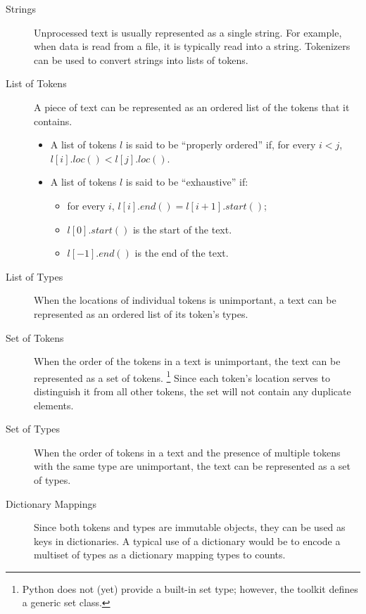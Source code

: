 \documentclass[11pt]{article}
\begin{document}
  \begin{description}

    \item[Strings] Unprocessed text is usually represented as a single
    string.  For example, when data is read from a file, it is
    typically read into a string.  Tokenizers can be used to convert
    strings into lists of tokens.

    \item[List of Tokens] A piece of text can be represented as an
    ordered list of the tokens that it contains.

    \begin{itemize}

        \item A list of tokens $l$ is said to be ``properly ordered''
        if, for every $i<j$, $l[i].loc()<l[j].loc()$.

        \item A list of tokens $l$ is said to be ``exhaustive'' if:

        \begin{itemize}
          \item for every $i$, $l[i].end() = l[i+1].start()$; 
          \item $l[0].start()$ is the start of the text.
          \item $l[-1].end()$ is the end of the text.
        \end{itemize}

    \end{itemize}

    \item[List of Types] When the locations of individual tokens is
    unimportant, a text can be represented as an ordered list of its
    token's types.

    \item[Set of Tokens] When the order of the tokens in a text is
    unimportant, the text can be represented as a set of tokens.
    \footnote{Python does not (yet) provide a built-in set type;
    however, the toolkit defines a generic set class.}  Since each
    token's location serves to distinguish it from all other tokens,
    the set will not contain any duplicate elements.

    \item[Set of Types] When the order of tokens in a text and the
    presence of multiple tokens with the same type are unimportant,
    the text can be represented as a set of types.

    \item[Dictionary Mappings] Since both tokens and types are
    immutable objects, they can be used as keys in dictionaries.  A
    typical use of a dictionary would be to encode a multiset of types
    as a dictionary mapping types to counts.

  \end{description}
\end{document}
